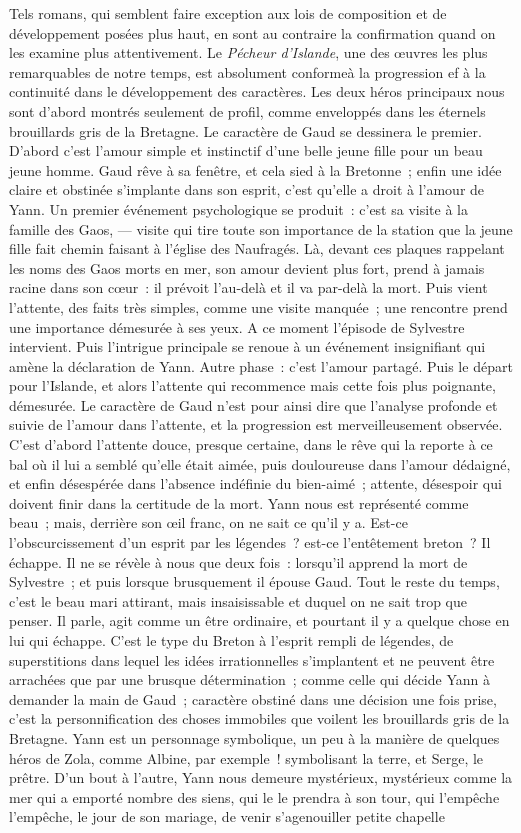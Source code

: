 \documentclass[french,twoside]{book} %
\begin{document}
{Tels romans, qui semblent faire exception aux lois de composition et de développement posées plus haut, en sont au contraire la confirmation quand on les examine plus attentivement. Le \emph{Pécheur d’Islande}, une des œuvres les plus remarquables de notre temps, est absolument conformeà la progression ef à la continuité dans le développement des caractères. Les deux héros principaux nous sont d’abord montrés seulement de profil, comme enveloppés dans les éternels brouillards gris de la Bretagne. Le caractère de Gaud se dessinera le premier. D’abord c’est l’amour simple et instinctif d’une belle jeune fille pour un beau jeune homme. Gaud rêve à sa fenêtre, et cela sied à la Bretonne ; enfin une idée claire et obstinée s’implante dans son esprit, c’est qu’elle a droit à l’amour de Yann. Un premier événement psychologique se produit : c’est sa visite à la famille des Gaos, — visite qui tire toute son importance de la station que la jeune fille fait chemin faisant à l’église des Naufragés. Là, devant ces plaques rappelant les noms des Gaos morts en mer, son amour devient plus fort, prend à jamais racine dans son cœur : il prévoit l’au-delà et il va par-delà la mort. Puis vient l’attente, des faits très simples, comme une visite manquée ; une rencontre prend une importance démesurée à ses yeux. A ce moment l’épisode de Sylvestre intervient. Puis l’intrigue principale se renoue à un événement insignifiant qui amène la déclaration de Yann. Autre phase : c’est l’amour partagé. Puis le départ pour l’Islande, et alors l’attente qui recommence mais cette fois plus poignante, démesurée. Le caractère de Gaud n’est pour ainsi dire que l’analyse profonde et suivie de l’amour dans l’attente, et la progression est merveilleusement observée. C’est d’abord l’attente douce, presque certaine, dans le rêve qui la reporte à ce bal où il lui a semblé qu’elle était aimée, puis douloureuse dans l’amour dédaigné, et enfin désespérée dans l’absence indéfinie du bien-aimé ; attente, désespoir qui doivent finir dans la certitude de la mort. Yann nous est représenté comme beau ; mais, derrière son œil franc, on ne sait ce qu’il y a. Est-ce l’obscurcissement d’un esprit par les légendes ? est-ce l’entêtement breton ? Il échappe. Il ne se révèle à nous que deux fois : lorsqu’il apprend la mort de Sylvestre ; et puis lorsque brusquement il épouse Gaud. Tout le reste du temps, c’est le beau mari attirant, mais insaisissable et duquel on ne sait trop que penser. Il parle, agit comme un être ordinaire, et pourtant il y a quelque chose en lui qui échappe. C’est le type du Breton à l’esprit rempli de légendes, de superstitions dans lequel les idées irrationnelles s’implantent et ne peuvent être arrachées que par une brusque détermination ; comme celle qui décide Yann à demander la main de Gaud ; caractère obstiné dans une décision une fois prise, c’est la personnification des choses immobiles que voilent les brouillards gris de la Bretagne. Yann est un personnage symbolique, un peu à la manière de quelques héros de Zola, comme Albine, par exemple ! symbolisant la terre, et Serge, le prêtre. D’un bout à l’autre, Yann nous demeure mystérieux, mystérieux comme la mer qui a emporté nombre des siens, qui le le prendra à son tour, qui l’empêche l’empêche, le jour de son mariage, de venir s’agenouiller petite chapelle }
\end{document}
